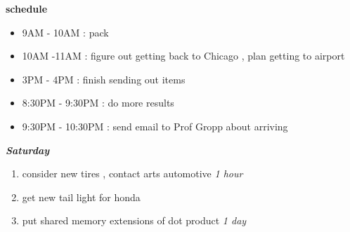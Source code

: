 \documentclass[11pt]{article}
\newcommand{\timeEst}[1]{\textit{#1}}
\begin{document}
\textbf{schedule}
\begin{itemize}
\item 9AM - 10AM :  pack
\item 10AM -11AM : figure out getting back to Chicago ,  plan getting to airport

\item 3PM - 4PM : finish sending out items
\item 8:30PM - 9:30PM :  do more results
\item 9:30PM - 10:30PM : send email to Prof Gropp about arriving

\end{itemize}

\textbf{\textit{Saturday}}
\begin{enumerate}


\item consider new tires , contact arts automotive \timeEst{1 hour}
\item get new tail light for honda
\item put shared memory extensions of dot product  \timeEst{1 day}
\end{enumerate}




\newpage
\end{document}
